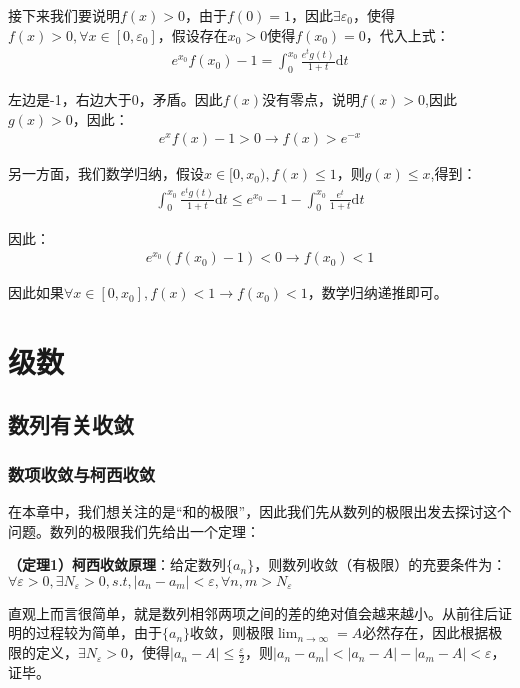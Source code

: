 \documentclass{ctexart}
\let\oldtextbf\textbf
\renewcommand{\textbf}[1]{\textcolor{brown!50!red}{\oldtextbf{#1}}}
\begin{document}
接下来我们要说明$f(x)>0$，由于$f(0)=1$，因此$\exists \varepsilon_0$，使得$f(x)>0,\forall x\in[0,\varepsilon_0]$，假设存在$x_0>0$使得$f(x_0)=0$，代入上式：
\begin{align*}
    e^{x_0}f(x_0)-1=\int_0^{x_0}\frac{e^tg(t)}{1+t}\mathrm{d}t
\end{align*}

左边是-1，右边大于0，矛盾。因此$f(x)$没有零点，说明$f(x)>0$,因此$g(x)>0$，因此：
\begin{align*}
    e^xf(x)-1>0\to f(x)>e^{-x}
\end{align*}

另一方面，我们数学归纳，假设$x\in[0,x_0),f(x)\leq 1$，则$g(x)\leq x$,得到：
\begin{align*}
    \int_0^{x_0}\frac{e^tg(t)}{1+t}\mathrm{d}t\leq e^{x_0}-1-\int_0^{x_0}\frac{e^t}{1+t}\mathrm{d}t
\end{align*}

因此：
\begin{align*}
    e^{x_0}(f(x_0)-1)<0\to f(x_0)<1
\end{align*}

因此如果$\forall x\in[0,x_0],f(x)<1\to f(x_0)<1$，数学归纳递推即可。 

\section{级数}
\subsection{数列有关收敛}
\subsubsection{数项收敛与柯西收敛}
在本章中，我们想关注的是“和的极限”，因此我们先从数列的极限出发去探讨这个问题。数列的极限我们先给出一个定理：
\begin{tcolorbox}[
    colback=bac2,     %
    colframe=fra2,   %
    coltitle=white,             %
    coltext=tex2,
    title=柯西收敛原理,
    fonttitle=\bfseries,        %
arc=3mm,                     %
breakable
]
\textbf{\color{brown!50!red}（定理1）柯西收敛原理}：给定数列$\{a_n\}$，则数列收敛（有极限）的充要条件为：$\forall \varepsilon>0,\exists N_\varepsilon>0,s.t,|a_n-a_m|<\varepsilon,\forall n,m>N_\varepsilon$
\end{tcolorbox}

直观上而言很简单，就是数列相邻两项之间的差的绝对值会越来越小。从前往后证明的过程较为简单，由于$\{a_n\}$收敛，则极限$\lim_{n\to\infty}=A$必然存在，因此根据极限的定义，$\exists N_\varepsilon>0$，使得$|a_n-A|\leq\frac{\varepsilon}{2}$，则$|a_n-a_m|<|a_n-A|-|a_m-A|<\varepsilon$，证毕。
\end{document}
